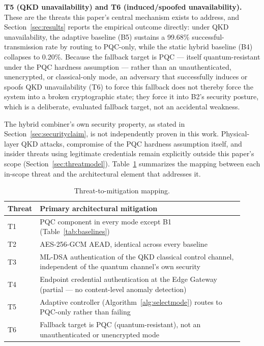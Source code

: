 \documentclass[journal]{IEEEtran}
\begin{document}
\textbf{T5 (QKD unavailability) and T6 (induced/spoofed unavailability).} These are the threats this paper's central mechanism exists to address, and Section~\ref{sec:results} reports the empirical outcome directly: under QKD unavailability, the adaptive baseline (B5) sustains a 99.68\% successful-transmission rate by routing to PQC-only, while the static hybrid baseline (B4) collapses to 0.20\%. Because the fallback target is PQC --- itself quantum-resistant under the PQC hardness assumption --- rather than an unauthenticated, unencrypted, or classical-only mode, an adversary that successfully induces or spoofs QKD unavailability (T6) to force this fallback does not thereby force the system into a broken cryptographic state; they force it into B2's security posture, which is a deliberate, evaluated fallback target, not an accidental weakness.

The hybrid combiner's own security property, as stated in Section~\ref{sec:securityclaim}, is not independently proven in this work. Physical-layer QKD attacks, compromise of the PQC hardness assumption itself, and insider threats using legitimate credentials remain explicitly outside this paper's scope (Section~\ref{sec:threatmodel}). Table~\ref{tab:threatmap} summarizes the mapping between each in-scope threat and the architectural element that addresses it.

\begin{table}[t]
\centering
\caption{Threat-to-mitigation mapping.}
\label{tab:threatmap}
\small
\begin{tabular}{@{}p{0.08\linewidth}p{0.84\linewidth}@{}}
\toprule
Threat & Primary architectural mitigation \\
\midrule
T1 & PQC component in every mode except B1 (Table~\ref{tab:baselines}) \\
T2 & AES-256-GCM AEAD, identical across every baseline \\
T3 & ML-DSA authentication of the QKD classical control channel, independent of the quantum channel's own security \\
T4 & Endpoint credential authentication at the Edge Gateway (partial --- no content-level anomaly detection) \\
T5 & Adaptive controller (Algorithm~\ref{alg:selectmode}) routes to PQC-only rather than failing \\
T6 & Fallback target is PQC (quantum-resistant), not an unauthenticated or unencrypted mode \\
\bottomrule
\end{tabular}
\end{table}
\end{document}
